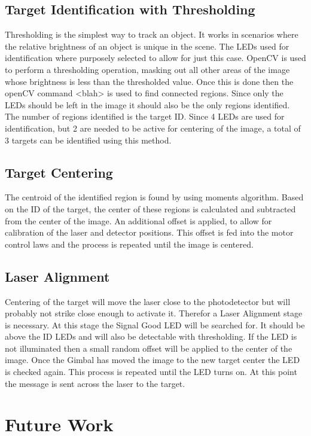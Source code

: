 \documentclass[botnum, fleqn]{unmeethesis}
\begin{document}
\subsection*{Target Identification with Thresholding}
Thresholding is the simplest way to track an object. It works in scenarios where the relative brightness of an object is unique in the scene. The LEDs used for identification where purposely selected to allow for just this case. OpenCV is used to perform a thresholding operation, masking out all other areas of the image whose brightness is less than the thresholded value. Once this is done then the openCV command <blah> is used to find connected regions. Since only the LEDs should be left in the image it should also be the only regions identified. The number of regions identified is the target ID. Since 4 LEDs are used for identification, but 2 are needed to be active for centering of the image, a total of 3 targets can be identified using this method.

\subsection*{Target Centering}
The centroid of the identified region is found by using moments algorithm. Based on the ID of the target, the center of these regions is calculated and subtracted from the center of the image. An additional offset is applied, to allow for calibration of the laser and detector positions. This offset is fed into the motor control laws and the process is repeated until the image is centered.

\subsection*{Laser Alignment}
Centering of the target will move the laser close to the photodetector but will probably not strike close enough to activate it. Therefor a Laser Alignment stage is necessary. At this stage the Signal Good LED will be searched for. It should be above the ID LEDs and will also be detectable with thresholding. If the LED is not illuminated then a small random offset will be applied to the center of the image. Once the Gimbal has moved the image to the new target center the LED is checked again. This process is repeated until the LED turns on.  At this point the message is sent across the laser to the target.


\section*{Future Work} \label{sec:Future Work}




\end{document}
